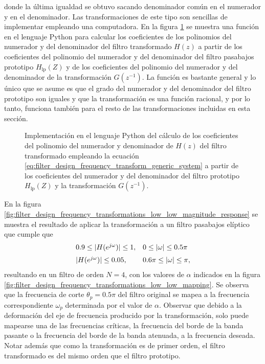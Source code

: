 \documentclass[a4paper]{report}
\begin{document}
donde la última igualdad se obtuvo sacando denominador común en el numerador y en el denominador. Las transformaciones de este tipo son sencillas de implementar empleando una computadora. En la figura \ref{fig:filter_design_frequency_transformation_coeficients_computation} se muestra una función en el lenguaje Python para calcular los coeficientes de los polinomios del numerador y del denominador del filtro transformado \(H(z)\) a partir de los coeficientes del polinomio del numerador y del denominador del filtro pasabajos prototipo \(H_\textrm{lp}(Z)\) y de los coeficientes del polinomio del numerador y del denominador de la transformación \(G(z^{-1})\). La función es bastante general y lo único que se asume es que el grado del numerador y del denominador del filtro prototipo son iguales y que la transformación es una función racional, y por lo tanto, funciona también para el resto de las transformaciones incluidas en esta sección.
\begin{figure}
\begin{center}
  
  \caption{\label{fig:filter_design_frequency_transformation_coeficients_computation} Implementación en el lenguaje Python del cálculo de los coeficientes del polinomio del numerador y denominador de \(H(z)\) del filtro transformado empleando la ecuación \ref{eq:filter_design_frequency_transform_generic_system} a partir de los coeficientes del numerador y del denominador del filtro prototipo \(H_\textrm{lp}(Z)\) y la transformación \(G(z^{-1})\).}
\end{center}
\end{figure}
En la figura \ref{fig:filter_design_frequency_transformations_low_low_magnitude_response} se muestra el resultado de aplicar la transformación a un filtro pasabajos elíptico que cumple que
\begin{equation}\label{eq:filter_design_frequency_transformations_low_low_example_specifications}
 \begin{array}{ll}
  0.9\leq|H(e^{j\omega})|\leq1, & 0\leq|\omega|\leq0.5\pi\\[\medskipamount]
  |H(e^{j\omega})|\leq0.05, & 0.6\pi\leq|\omega|\leq\pi,
 \end{array}  
\end{equation}
resultando en un filtro de orden \(N=4\), con los valores de \(\alpha\) indicados en la figura \ref{fig:filter_design_frequency_transformations_low_low_mapping}. Se observa que la frecuencia de corte \(\theta_p=0.5\pi\) del filtro original se mapea a la frecuencia correspondiente \(\omega_p\) determinada por el valor de \(\alpha\). Observar que debido a la deformación del eje de frecuencia producido por la transformación, solo puede mapearse una de las frecuencias críticas, la frecuencia del borde de la banda pasante o la frecuencia del borde de la banda atenuada, a la frecuencia deseada. Notar además que como la transformación es de primer orden, el filtro transformado es del mismo orden que el filtro prototipo.
\end{document}
